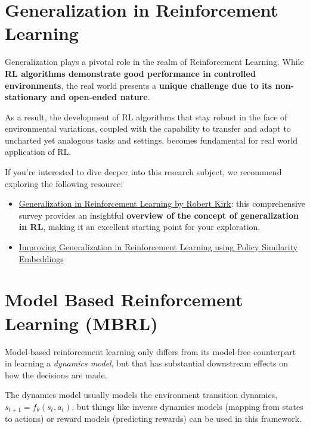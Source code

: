 \documentclass[11pt,a4paper]{article}
\begin{document}
\section{Generalization in Reinforcement Learning}\label{generalization-in-reinforcement-learning}

Generalization plays a pivotal role in the realm of Reinforcement Learning. While \textbf{RL algorithms demonstrate good performance in controlled environments}, the real world presents a \textbf{unique challenge due to its non-stationary and open-ended nature}.

As a result, the development of RL algorithms that stay robust in the face of environmental variations, coupled with the capability to transfer and adapt to uncharted yet analogous tasks and settings, becomes fundamental for real world application of RL.

If you're interested to dive deeper into this research subject, we recommend exploring the following resource:

\begin{itemize}
\item
  \href{https://robertkirk.github.io/2022/01/17/generalisation-in-reinforcement-learning-survey.html}{Generalization in Reinforcement Learning by Robert Kirk}: this comprehensive survey provides an insightful \textbf{overview of the concept of generalization in RL}, making it an excellent starting point for your exploration.
\item
  \href{https://blog.research.google/2021/09/improving-generalization-in.html?m=1}{Improving Generalization in Reinforcement Learning using Policy Similarity Embeddings}
\end{itemize}

\section{Model Based Reinforcement Learning (MBRL)}\label{model-based-reinforcement-learning-mbrl}

Model-based reinforcement learning only differs from its model-free counterpart in learning a \emph{dynamics model}, but that has substantial downstream effects on how the decisions are made.

The dynamics model usually models the environment transition dynamics, \(s_{t+1} = f_\theta (s_t, a_t)\), but things like inverse dynamics models (mapping from states to actions) or reward models (predicting rewards) can be used in this framework.
\end{document}
